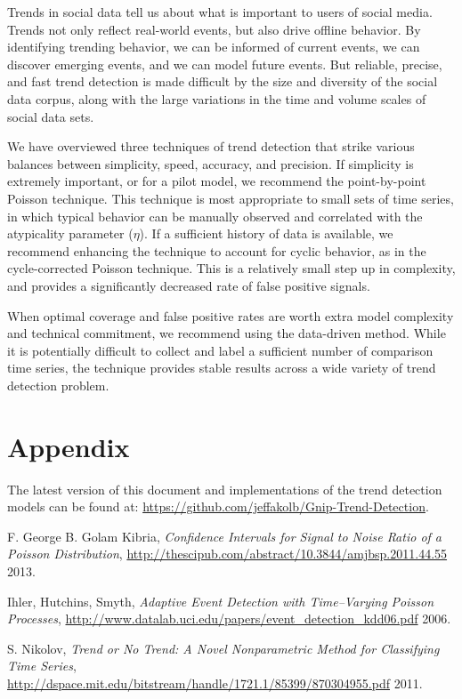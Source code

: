 \documentclass{article}
\begin{document}
Trends in social data tell us about what is important to users of social media.
Trends not only reflect real-world events, but also drive offline behavior. By
identifying trending behavior, we can be informed of current events, we can
discover emerging events, and we can model future events. But reliable,
precise, and fast trend detection is made difficult by the size and diversity
of the social data corpus, along with the large variations in the time and
volume scales of social data sets. 

We have overviewed three techniques of trend detection that strike various
balances between simplicity, speed, accuracy, and precision.
If simplicity is extremely important, or for a pilot model, we
recommend the point-by-point Poisson technique. This technique is most
appropriate to small sets of time series, in which typical behavior can be
manually observed and correlated with the atypicality parameter ($\eta$). If a 
sufficient history of data is available, we recommend enhancing the technique
to account for cyclic behavior, as in the cycle-corrected Poisson technique.
This is a relatively small step up in complexity, and provides a significantly
decreased rate of false positive signals. 

When optimal coverage and false positive rates are worth extra model complexity
and technical commitment, we recommend using the data-driven method. While it
is potentially difficult to collect and label a sufficient number of comparison
time series, the technique provides stable results across a wide variety of
trend detection problem. 


\appendix
\section{Appendix}
The latest version of this document 
and implementations of the trend detection models 
can be found at:
\noindent \url{https://github.com/jeffakolb/Gnip-Trend-Detection}.

%



\begin{thebibliography}{2013}

 F. George B. Golam Kibria, \textsl{Confidence
    Intervals for Signal to Noise Ratio of a Poisson Distribution},
    \url{http://thescipub.com/abstract/10.3844/amjbsp.2011.44.55} 2013.

 Ihler, Hutchins, Smyth, \textsl{Adaptive Event
    Detection with Time–Varying Poisson Processes},
    \url{http://www.datalab.uci.edu/papers/event_detection_kdd06.pdf} 2006.

 S. Nikolov, \textsl{Trend or No Trend: A Novel
    Nonparametric Method for Classifying Time Series},
    \url{http://dspace.mit.edu/bitstream/handle/1721.1/85399/870304955.pdf}
    2011.  

\end{thebibliography}
\end{document}
